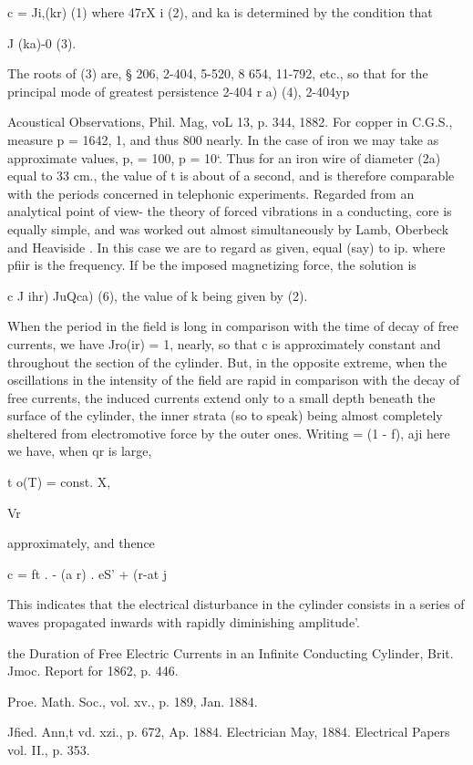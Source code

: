 c =  Ji,(kr) (1)
where
47rX i
(2),
and ka is determined by the condition that

J (ka)-0 (3).

The roots of (3) are, § 206, 2-404, 5-520, 8 654, 11-792, etc.,
so that for the principal mode of greatest persistence 2-404 r a) (4),
 2-404yp

Acoustical Observations, Phil. Mag, voL 13, p. 344, 1882.
For copper in C.G.S., measure p = 1642, 1, and thus 800 nearly.
In the case of iron we may take as approximate values, p, = 100,
p = 10‘. Thus for an iron wire of diameter (2a) equal to 33 cm.,
the value of t is about of a second, and is therefore comparable
with the periods concerned in telephonic experiments.
Regarded from an analytical point of view- the theory of forced
vibrations in a conducting, core is equally simple, and was worked
out almost simultaneously by Lamb, Oberbeck and Heaviside .
In this case we are to regard  as given, equal (say) to ip. where
pfiir is the frequency. If be the imposed magnetizing force,
the solution is

c J ihr) JuQca) (6),
the value of k being given by (2).

When the period in the field is long in comparison with the
time of decay of free currents, we have Jro(ir) = 1, nearly, so that
c is approximately constant and throughout the section of
the cylinder. But, in the opposite extreme, when the oscillations
in the intensity of the field are rapid in comparison with the decay
of free currents, the induced currents extend only to a small depth
beneath the surface of the cylinder, the inner strata (so to speak)
being almost completely sheltered from electromotive force by the
outer ones. Writing = (1 - f), aji here
we have, when qr is large,

t o(T) = const. X,

Vr

approximately, and thence

c = ft . - (a r) . eS' + (r-at j

This indicates that the electrical disturbance in the cylinder
consists in a series of waves propagated inwards with rapidly
diminishing amplitude'.

the Duration of Free Electric Currents in an Infinite Conducting Cylinder,
Brit. Jmoc. Report for 1862, p. 446.

Proe. Math. Soc., vol. xv., p. 189, Jan. 1884.

Jfied. Ann,t vd. xzi., p. 672, Ap. 1884.
Electrician May, 1884. Electrical Papers vol. II., p. 353.

